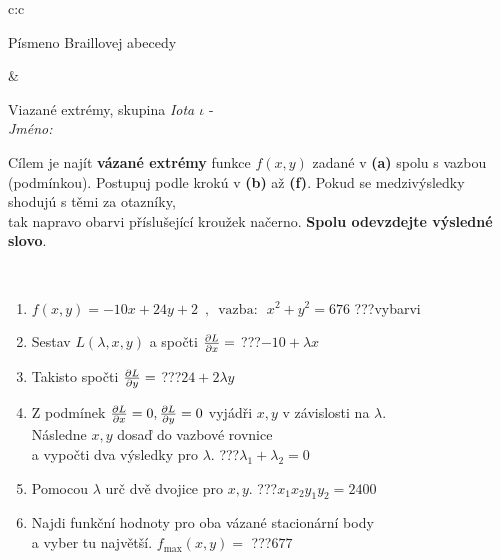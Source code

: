 \documentclass[10pt]{report}
\begin{document}
\begin{tabular}{c:c}
\begin{minipage}[c][104.5mm][t]{0.5\linewidth}
\begin{center}
\begin{minipage}{0.20\linewidth}
\begin{center}
{\small Písmeno Braillovej abecedy}
\end{center}
\end{minipage}
\end{center}
\end{minipage}
&
\begin{minipage}[c][104.5mm][t]{0.5\linewidth}
\begin{center}
\vspace{7mm}
{\huge Viazané extrémy, skupina \textit{Iota $\iota$} -}\\[5mm]
\textit{Jméno:}\phantom{xxxxxxxxxxxxxxxxxxxxxxxxxxxxxxxxxxxxxxxxxxxxxxxxxxxxxxxxxxxxxxxxx}\\[5mm]
\begin{minipage}{0.95\linewidth}
\begin{center}
Cílem je najít \textbf{vázané extrémy} funkce $f(x,y)$ zadané v \textbf{(a)} spolu s vazbou (podmínkou). Postupuj podle krokú v \textbf{(b)} až \textbf{(f)}. Pokud se medzivýsledky shodujú s těmi za otazníky,\\tak napravo obarvi příslušející kroužek načerno. \textbf{Spolu odevzdejte výsledné slovo}.
\end{center}
\end{minipage}
\\[1mm]
\begin{minipage}{0.79\linewidth}
\begin{center}
\begin{varwidth}{\linewidth}
\begin{enumerate}
\normalsize
\item $f(x,y)=-10x+24y+2 \enspace , \enspace \mathrm{vazba:} \enspace x^2+y^2=676$\quad \dotfill\; ???\;\dotfill \quad vybarvi
\item Sestav $L(\lambda,x,y)$ a spočti $\pdv{L}{x}=$\quad \dotfill\; ???\;\dotfill \quad $-10+\lambda x$
\item Takisto spočti $\pdv{L}{y}=$\quad \dotfill\; ???\;\dotfill \quad $24+2\lambda y$
\item Z podmínek $\pdv{L}{x}=0 , \pdv{L}{y}=0$ vyjádři $x,y$ v závislosti na $\lambda$.\\ \phantom{xxxxxx}Následne $x,y$ dosaď do vazbové rovnice\\ \phantom{xxxxxx}a vypočti dva výsledky pro $\lambda$.\quad \dotfill\; ???\;\dotfill \quad $\lambda_1+\lambda_2=0$
\item Pomocou $\lambda$ urč dvě dvojice pro $x,y$.\quad \dotfill\; ???\;\dotfill \quad $x_1 x_2 y_1 y_2=2400$
\item Najdi funkční hodnoty pro oba vázané stacionární body\\ \phantom{xxxxxx}a vyber tu najvětší. $f_{\text{max}}(x,y)=$\quad \dotfill\; ???\;\dotfill \quad $677$

\end{enumerate}
\end{varwidth}
\end{center}
\end{minipage}
\end{center}
\end{minipage}
\end{tabular}
\end{document}
